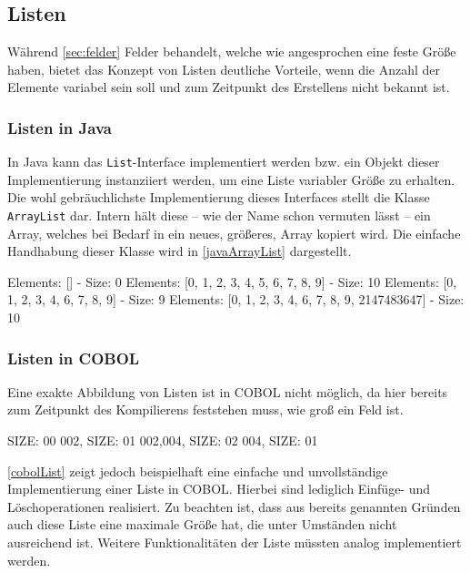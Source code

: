 \subsection{Listen}\label{lists}
Während \autoref{sec:felder} Felder behandelt, welche wie angesprochen eine feste Größe haben, bietet das Konzept von Listen deutliche Vorteile, wenn die Anzahl der Elemente variabel sein soll und zum Zeitpunkt des Erstellens nicht bekannt ist.

\subsubsection*{Listen in Java}
In Java kann das \texttt{List}-Interface implementiert werden bzw. ein Objekt dieser Implementierung instanziiert werden, um eine Liste variabler Größe zu erhalten. Die wohl gebräuchlichste Implementierung dieses Interfaces stellt die Klasse \texttt{ArrayList} dar. Intern hält diese -- wie der Name schon vermuten lässt -- ein Array, welches bei Bedarf in ein neues, größeres, Array kopiert wird. Die einfache Handhabung dieser Klasse wird in  \autoref{javaArrayList} dargestellt.

\begin{shellwindow}
Elements: [] - Size: 0
Elements: [0, 1, 2, 3, 4, 5, 6, 7, 8, 9] - Size: 10
Elements: [0, 1, 2, 3, 4, 6, 7, 8, 9] - Size: 9
Elements: [0, 1, 2, 3, 4, 6, 7, 8, 9, 2147483647] - Size: 10
\end{shellwindow}

\subsubsection*{Listen in COBOL}
Eine exakte Abbildung von Listen ist in COBOL nicht möglich, da hier bereits zum Zeitpunkt des Kompilierens feststehen muss, wie groß ein Feld ist.

\begin{shellwindow}
 SIZE: 00
002, SIZE: 01
002,004, SIZE: 02
004, SIZE: 01
\end{shellwindow}

\autoref{cobolList} zeigt jedoch beispielhaft eine einfache und unvollständige Implementierung einer Liste in COBOL. Hierbei sind lediglich Einfüge- und Löschoperationen realisiert. Zu beachten ist, dass aus bereits genannten Gründen auch diese Liste eine maximale Größe hat, die unter Umständen nicht ausreichend ist. Weitere Funktionalitäten der Liste müssten analog implementiert werden.